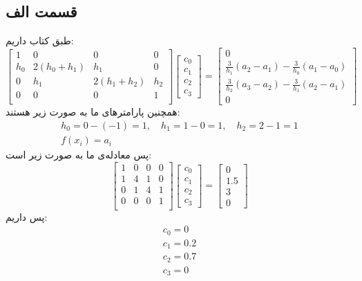 \documentclass[]{article}
\begin{document}
\subsection*{قسمت الف}
طبق کتاب داریم:
\[
\begin{bmatrix}
    1 & 0 & 0 & 0 \\
    h_0 & 2(h_0+h_1) & h_1 & 0 \\
    0 & h_1 & 2(h_1+h_2) & h_2\\
    0 & 0 & 0 & 1 \\
\end{bmatrix}
\begin{bmatrix}
    c_0\\
    c_1\\
    c_2\\
    c_3
\end{bmatrix}
=
\begin{bmatrix}
    0\\
    \frac{3}{h_1}(a_2 - a_1) - \frac{3}{h_0}(a_1 - a_0)\\
    \frac{3}{h_2}(a_3 - a_2) - \frac{3}{h_1}(a_2 - a_1)\\
    0
\end{bmatrix}
\]
همچنین پارامتر‌های ما به صورت زیر هستند:
\begin{gather*}
    h_0 = 0 - (-1) = 1, \quad h_1 = 1 - 0 = 1, \quad h_2 = 2 - 1 = 1\\
    f(x_i) = a_i
\end{gather*}
پس معادله‌ی ما به صورت زیر است:
\[
\begin{bmatrix}
    1 & 0 & 0 & 0 \\
    1 & 4 & 1 & 0 \\
    0 & 1 & 4 & 1\\
    0 & 0 & 0 & 1 \\
\end{bmatrix}
\begin{bmatrix}
    c_0\\
    c_1\\
    c_2\\
    c_3
\end{bmatrix}
=
\begin{bmatrix}
    0\\
    1.5\\
    3\\
    0
\end{bmatrix}
\]
پس داریم:
\begin{gather*}
    c_0 = 0\\
    c_1 = 0.2\\
    c_2 = 0.7\\
    c_3 = 0
\end{gather*}
\end{document}
